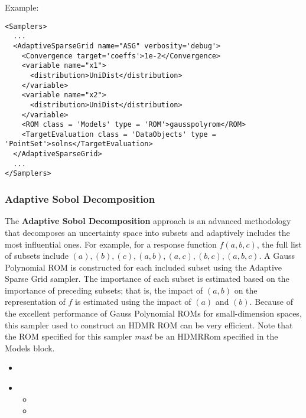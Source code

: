 Example:
\begin{lstlisting}[style=XML,morekeywords={class,limit,subGridTol,weight,persistence}]
<Samplers>
  ...
  <AdaptiveSparseGrid name="ASG" verbosity='debug'>
    <Convergence target='coeffs'>1e-2</Convergence>
    <variable name="x1">
      <distribution>UniDist</distribution>
    </variable>
    <variable name="x2">
      <distribution>UniDist</distribution>
    </variable>
    <ROM class = 'Models' type = 'ROM'>gausspolyrom</ROM>
    <TargetEvaluation class = 'DataObjects' type = 'PointSet'>solns</TargetEvaluation>
  </AdaptiveSparseGrid>
  ...
</Samplers>
\end{lstlisting}
\subsubsection{Adaptive Sobol Decomposition}
\label{subsubsubsec:AdaptiveSobol}
The \textbf{Adaptive Sobol Decomposition} approach is an advanced methodology that decomposes an uncertainty
space into subsets and adaptively includes the most influential ones.  For example, for a response function
$f(a,b,c)$, the full list of subsets include $(a), (b), (c), (a,b), (a,c), (b,c), (a,b,c)$.  A Gauss Polynomial ROM is
constructed for each included subset using the Adaptive Sparse Grid sampler.  The importance of each subset is
estimated based on the importance of preceding subsets; that is, the impact of $(a,b)$ on the representation
of $f$ is estimated using the impact of $(a)$ and $(b)$.  Because of the excellent performance of Gauss
Polynomial ROMs for small-dimension spaces, this sampler used to construct an HDMR ROM can be very efficient.
Note that the ROM specified for this sampler \emph{must} be an HDMRRom specified in the Models block.
%

%
\attrIntro

\begin{itemize}
  \itemsep0em
  \item \nameDescription
\end{itemize}


\begin{itemize}
  \item \variableDescription
    \variableChildrenIntro
    \begin{itemize}
      \item \distributionDescription
    \item \functionDescription
    \end{itemize}
\end{itemize}

